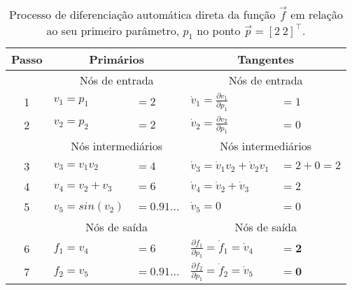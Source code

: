       \begin{table}[]
        \centering
        \begin{tabular}{@{}cllll@{}}
          \toprule
          \textbf{Passo} & \multicolumn{2}{c}{\textbf{Primários}}  & \multicolumn{2}{c}{\textbf{Tangentes}}                        \\  \midrule
            & \multicolumn{2}{c}{\color{gray} \footnotesize Nós de entrada}                    & \multicolumn{2}{c}{\color{gray} \footnotesize Nós de entrada}                                               \\
          {\color{gray} 1}     & $v_1 = p_1$                       & $=2$              & $\dot{v}_1 = \frac{\partial v_1}{\partial p_1}$             & $=1$       \\
          {\color{gray} 2}     & $v_2 = p_2$                       & $=2$              & $\dot{v}_2 = \frac{\partial v_2}{\partial p_1}$             & $=0$       \\
            & \multicolumn{2}{c}{\color{gray} \footnotesize Nós intermediários}                    & \multicolumn{2}{c}{\color{gray} \footnotesize Nós intermediários}                                               \\
          {\color{gray} 3}     & $v_3 = v_1 v_2$                   & $=4$                & $\dot{v}_3 = \dot{v}_1 v_2 + \dot{v}_2 v_1$                 & $= 2+0= 2$ \\
          {\color{gray} 4}     & $v_4 = v_2 + v_3$                 & $=6$                & $\dot{v}_4 = \dot{v}_2 + \dot{v}_3$                         & $=2$       \\
          {\color{gray} 5}     & $v_5 = sin(v_2)$                  & $=0.91\ldots$       & $\dot{v}_5 = 0$                                             & $= 0$      \\
            & \multicolumn{2}{c}{\color{gray} \footnotesize Nós de saída}                    & \multicolumn{2}{c}{\color{gray} \footnotesize Nós de saída}                                               \\
          {\color{gray} 6}     & $f_1 = v_4$            & $=6$               & $\frac{\partial f_1}{\partial p_1} = \dot{f}_1 = \dot{v}_4$ & $\boldsymbol{=2}$       \\
          {\color{gray} 7}     & $f_2 = v_5$   & $=0.91\ldots$               & $\frac{\partial f_2}{\partial p_1} = \dot{f}_2 = \dot{v}_5$ & $\boldsymbol{=0}$      \\ \bottomrule
        \end{tabular}
        \caption{Processo de diferenciação automática direta da função $\vec{f}$ em relação ao seu primeiro parâmetro, $p_1$ no ponto $\vec{p} = [2\ 2]^\top$.}
        \label{t:autodiff_direta_exemplo}
      \end{table}

